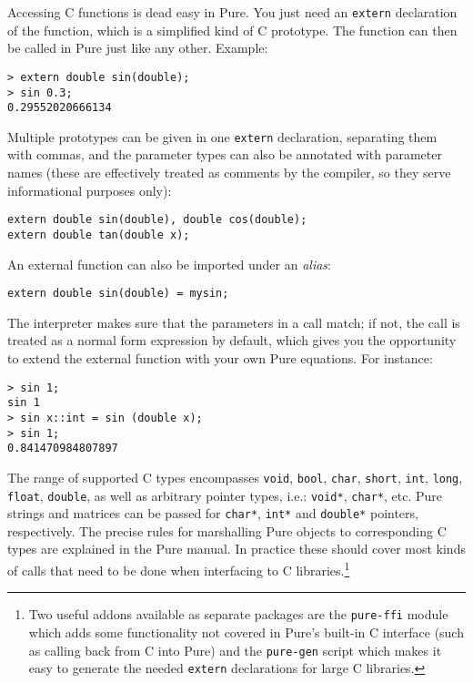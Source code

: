 \documentclass[a4paper,12pt]{article}
\begin{document}
Accessing C functions is dead easy in Pure. You just need an \lstinline{extern} declaration of the function, which is a simplified kind of C prototype. The function can then be called in Pure just like any other. Example:

\begin{lstlisting}
> extern double sin(double);
> sin 0.3;
0.29552020666134
\end{lstlisting}

Multiple prototypes can be given in one \lstinline{extern} declaration, separating them with commas, and the parameter types can also be annotated with parameter names (these are effectively treated as comments by the compiler, so they serve informational purposes only):

\begin{lstlisting}
extern double sin(double), double cos(double);
extern double tan(double x);
\end{lstlisting}

An external function can also be imported under an \emph{alias}:

\begin{lstlisting}
extern double sin(double) = mysin;
\end{lstlisting}

The interpreter makes sure that the parameters in a call match; if not, the call is treated as a normal form expression by default, which gives you the opportunity to extend the external function with your own Pure equations. For instance:

\begin{lstlisting}
> sin 1;
sin 1
> sin x::int = sin (double x);
> sin 1;
0.841470984807897
\end{lstlisting}

The range of supported C types encompasses \verb|void|, \verb|bool|, \verb|char|, \verb|short|, \verb|int|, \verb|long|, \verb|float|, \verb|double|, as well as arbitrary pointer types, i.e.: \verb|void*|, \verb|char*|, etc. Pure strings and matrices can be passed for \verb|char*|, \verb|int*| and \verb|double*| pointers, respectively. The precise rules for marshalling Pure objects to corresponding C types are explained in the Pure manual. In practice these should cover most kinds of calls that need to be done when interfacing to C libraries.\footnote{Two useful addons available as separate packages are the \texttt{pure-ffi} module which adds some functionality not covered in Pure's built-in C interface (such as calling back from C into Pure) and the \texttt{pure-gen} script which makes it easy to generate the needed \lstinline{extern} declarations for large C libraries.}
\end{document}
